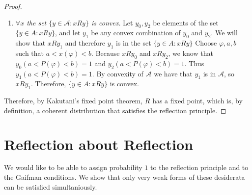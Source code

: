 \documentclass[12pt]{article}
\theoremstyle{plain}
\theoremstyle{definition}
\theoremstyle{remark}
\begin{document}
\begin{proof}
\begin{enumerate}
\item \emph{$\forall x$ the set $\{y \in \mathcal{A}: xRy\}$ is convex.}
Let $y_0, y_2$ be elements of the set $\{y \in A: xRy\}$, and let $y_1$ be any convex combination of $y_0$ and $y_2$.
We will show that $xRy_1$ and therefore $y_1$ is in the set $\{y \in A: xRy\}$
Choose $\varphi, a, b$ such that $a < x(\varphi) < b$.
Because $xRy_0$ and $xRy_2$, we know that $y_0(a < P(\varphi) < b) = 1$ and $y_2(a < P(\varphi) < b) = 1$.
Thus $y_1(a < P(\varphi) < b) = 1$.
By convexity of $\mathcal{A}$ we have that $y_1$ is in $\mathcal{A}$, so $xRy_1$.
Therefore, $\{y \in A: xRy\}$ is convex.
\end{enumerate}

Therefore, by Kakutani's fixed point theorem, $R$ has a fixed point, which is, by definition, a coherent distribution that satisfies the reflection principle.
\end{proof}


\section{Reflection about Reflection}
\label{refl-refl}
We would like to be able to assign probability $1$ to the reflection principle and to the Gaifman conditions.
We show that only very weak forms of these desiderata can be satisfied simultaniously.
\end{document}
